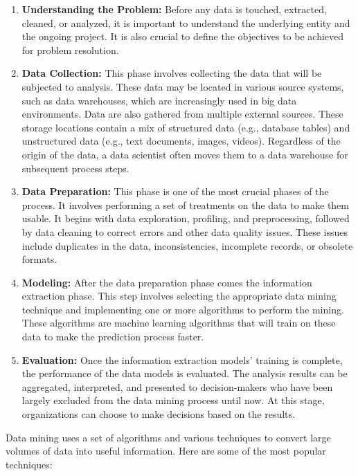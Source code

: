 \begin{enumerate}
	\item \textbf{Understanding the Problem:} Before any data is touched, extracted, cleaned, or analyzed, it is important to understand the underlying entity and the ongoing project. It is also crucial to define the objectives to be achieved for problem resolution.
	
	\item \textbf{Data Collection:} This phase involves collecting the data that will be subjected to analysis. These data may be located in various source systems, such as data warehouses, which are increasingly used in big data environments. Data are also gathered from multiple external sources. These storage locations contain a mix of structured data (e.g., database tables) and unstructured data (e.g., text documents, images, videos). Regardless of the origin of the data, a data scientist often moves them to a data warehouse for subsequent process steps.
	
	\item \textbf{Data Preparation:} This phase is one of the most crucial phases of the process. It involves performing a set of treatments on the data to make them usable. It begins with data exploration, profiling, and preprocessing, followed by data cleaning to correct errors and other data quality issues. These issues include duplicates in the data, inconsistencies, incomplete records, or obsolete formats.
	
	\item \textbf{Modeling:} After the data preparation phase comes the information extraction phase. This step involves selecting the appropriate data mining technique and implementing one or more algorithms to perform the mining. These algorithms are machine learning algorithms that will train on these data to make the prediction process faster.
	
	\item \textbf{Evaluation:} Once the information extraction models' training is complete, the performance of the data models is evaluated. The analysis results can be aggregated, interpreted, and presented to decision-makers who have been largely excluded from the data mining process until now. At this stage, organizations can choose to make decisions based on the results.
\end{enumerate}


Data mining uses a set of algorithms and various techniques to convert large volumes of data into useful information. Here are some of the most popular techniques:

